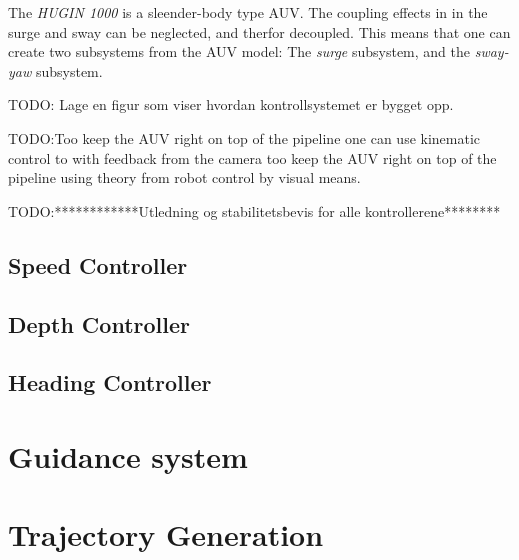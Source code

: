 	The \textit{HUGIN 1000} is a sleender-body type AUV. The coupling effects in in the surge and sway can be neglected, and therfor decoupled. This means that one can create two subsystems from the AUV model: The \textit{surge} subsystem, and the \textit{sway-yaw} subsystem. 
	
	TODO: Lage en figur som viser hvordan kontrollsystemet er bygget opp.
	
	TODO:Too keep the AUV right on top of the pipeline one can use kinematic control to with feedback from the camera too keep the AUV right on top of the pipeline using theory from robot control by visual means.
	
	
	TODO:************Utledning og stabilitetsbevis for alle kontrollerene********
	\subsection{Speed Controller}
	
	
	
	\subsection{Depth Controller}

	
	
	\subsection{Heading Controller}
	
	
\section{Guidance system}
	
	
\section{Trajectory Generation}

	
